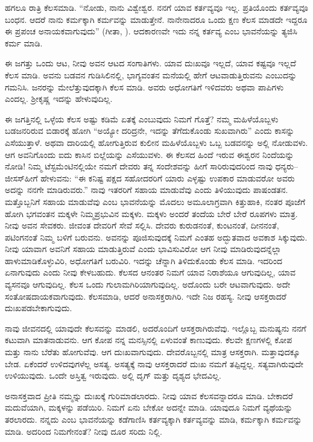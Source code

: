 ಹಗಲೂ ರಾತ್ರಿ ಕೆಲಸಮಾಡಿ. “ನೋಡು, ನಾನು ವಿಶ್ವೇಶ್ವರ. ನನಗೆ ಯಾವ ಕರ್ತವ್ಯವೂ ಇಲ್ಲ. ಪ್ರತಿಯೊಂದು ಕರ್ತವ್ಯವೂ ಬಂಧನ. ಆದರೆ ನಾನು ಕರ್ಮಕ್ಕಾಗಿ ಕರ್ಮವನ್ನು ಮಾಡುತ್ತೇನೆ. ನಾನೇನಾದರೂ ಒಂದು ಕ್ಷಣ ಕೆಲಸ ಮಾಡದೇ ಇದ್ದರೂ ಈ ಪ್ರಪಂಚ ಅನಾಯಕ\-ವಾಗುವುದು” (ಗೀತಾ, ). ಆದಕಾರಣವೇ ಇದು ನನ್ನ ಕರ್ತವ್ಯ ಎಂಬ ಭಾವನೆಯನ್ನು ತ್ಯಜಿಸಿ ಕರ್ಮ ಮಾಡಿ.

ಈ ಜಗತ್ತು ಒಂದು ಆಟ, ನೀವು ಅವನ ಆಟದ ಸಂಗಾತಿಗಳು. ಯಾವ ದುಃಖವೂ ಇಲ್ಲದೆ, ಯಾವ ಕಷ್ಟವೂ ಇಲ್ಲದೆ ಕೆಲಸ ಮಾಡಿ. ಅವನು ಬಡವನ ಗುಡಿಸಿಲಿನಲ್ಲಿ, ಭಾಗ್ಯವಂತನ ಮನೆಯಲ್ಲಿ ಹೇಗೆ ಆಟವಾಡುತ್ತಿರುವನು ಎಂಬುದನ್ನು ಗಮನಿಸಿ. ಜನರನ್ನು ಮೇಲೆತ್ತುವುದಕ್ಕಾಗಿ ಕೆಲಸ ಮಾಡಿ. ಅವರು ಅಧೋಗತಿಗೆ ಇಳಿದವರು ಅಥವಾ ಪಾಪಿಗಳು ಎಂದಲ್ಲ. ಶ‍್ರೀಕೃಷ್ಣ ಇದನ್ನು ಹೇಳುವುದಿಲ್ಲ.

ಈ ಜಗತ್ತಿನಲ್ಲಿ ಒಳ್ಳೆಯ ಕೆಲಸ ಅಷ್ಟು ಕಡಿಮೆ ಏತಕ್ಕೆ ಎಂಬುವುದು ನಿಮಗೆ ಗೊತ್ತೆ? ನಮ್ಮ ಮಹಿಳೆಯೊಬ್ಬಳು ಬಡಜನರಿರುವ ಬಿಡಾರಕ್ಕೆ ಹೋಗಿ “ಅಯ್ಯೋ ದರಿದ್ರನೇ, ಇದನ್ನು ತೆಗೆದುಕೊಂಡು ಸುಖವಾಗಿರು” ಎಂದು ಕಾಸನ್ನು ಎಸೆಯುತ್ತಾಳೆ. ಅಥವಾ ದಾರಿಯಲ್ಲಿ ಹೋಗುತ್ತಿರುವ ಕುಲೀನ ಮಹಿಳೆಯೊಬ್ಬಳು ಒಬ್ಬ ಬಡವನನ್ನು ಅಲ್ಲಿ ನೋಡುವಳು. ಆಗ ಅವನಿಗೊಂದು ಐದು ಕಾಸಿನ ಬಿಲ್ಲೆಯನ್ನು ಎಸೆಯುವಳು. ಈ ಕೆಲಸದ ಹಿಂದೆ ಇರುವ ಈಶ್ವರನ ನಿಂದೆಯನ್ನು ನೋಡಿ! ನಿಮ್ಮ ಟೆಸ್ಟಮೆಂಟಿನಲ್ಲಿಯೇ ನಮಗೆ ದೇವರು ತನ್ನ ಸಂದೇಶವನ್ನು ಹೀಗೆ ಸಾರಿರುವುದರಿಂದ ನಾವು ಧನ್ಯರು– ಜೀಸಸ್​ ಹೀಗೆ ಹೇಳುವನು: “ಈ ಕನಿಷ್ಟ ಪಕ್ಷದ ಸಹೋದರರಿಗೆ ಯಾರು ಎಳ್ಳಷ್ಟು ಉಪಕಾರ ಮಾಡುವರೋ ಅವರು ಅದನ್ನು ನನಗೇ ಮಾಡಿರುವರು.” ನಾವು ಇತರರಿಗೆ ಸಹಾಯ ಮಾಡುವೆವು ಎಂದು ತಿಳಿಯುವುದು ಪಾಷಂಡತನ. ಮತ್ತೊಬ್ಬನಿಗೆ ಸಹಾಯ ಮಾಡುವೆವು ಎಂಬ ಭಾವನೆಯನ್ನು ಮೊದಲು ಅಮೂಲಾಗ್ರವಾಗಿ ಕಿತ್ತುಹಾಕಿ, ನಂತರ ಪೂಜೆಗೆ ಹೋಗಿ ಭಗವಂತನ ಮಕ್ಕಳೇ ನಿಮ್ಮ\break ಪ್ರಭುವಿನ ಮಕ್ಕಳು. ಮಕ್ಕಳು ಅಂದರೆ ತಂದೆಯ ಬೇರೆ ಬೇರೆ ರೂಪಗಳು ಮಾತ್ರ. ನೀವು ಅವನ ಸೇವಕರು. ಜೀವಂತ ದೇವರಿಗೆ ಸೇವೆ ಸಲ್ಲಿಸಿ. ದೇವರು ಕುರುಡನಂತೆ, ಕುಂಟನಂತೆ, ದೀನನಂತೆ, ಪಟಿಂಗನಂತೆ ನಿಮ್ಮ ಬಳಿಗೆ ಬರುವನು. ಅವನನ್ನು ಪೂಜಿಸುವುದಕ್ಕೆ ನಿಮಗೆ ಎಂತಹ ಅದ್ಭುತವಾದ ಅವಕಾಶ ಸಿಕ್ಕುವುದು. ನೀವು ಯಾವಾಗ ಅವನಿಗೆ ಸಹಾಯ ಮಾಡುತ್ತಿರುವೆ ಎಂದು ಭಾವಿಸುವಿರೋ ಆಗ ನೀವು ಮಾಡಿರುವುದನ್ನೆಲ್ಲಾ ಹಾಳುಮಾಡಿಕೊಳ್ಳುವಿರಿ, ಅಧೋಗತಿಗೆ ಬರುವಿರಿ. ಇದನ್ನು ಚೆನ್ನಾಗಿ ತಿಳಿದುಕೊಂಡು ಕೆಲಸ ಮಾಡಿ. ಇದರಿಂದ ಏನಾಗುವುದು ಎಂದು ನೀವು ಕೇಳಬಹುದು. ಕೆಲಸದ ಆನಂತರ ನಿಮಗೆ ಯಾವ ನಿರಾಶೆಯೂ ಆಗುವುದಿಲ್ಲ, ಯಾವ ವ್ಯಸನವೂ ಆಗುವುದಿಲ್ಲ. ಕೆಲಸ ಒಂದು ಗುಲಾಮಗಿರಿಯಾಗುವುದಿಲ್ಲ. ಅದೊಂದು ಬರೇ ಆಟವಾಗುವುದು. ಅದೇ ಸಂತೋಷದಾಯಕವಾಗುವುದು. ಕೆಲಸಮಾಡಿ, ಆದರೆ ಅನಾಸಕ್ತರಾಗಿರಿ. ಇದೇ ನಿಜ ರಹಸ್ಯ. ನೀವು ಆಸಕ್ತರಾದರೆ ದುಃಖಪಡಬೇಕಾಗುವುದು.

ನಾವು ಜೀವನದಲ್ಲಿ ಯಾವುದೇ ಕೆಲಸವನ್ನು ಮಾಡಲಿ, ಅದರೊಂದಿಗೆ ಆಸಕ್ತರಾಗಿರು\-ವೆವು. ಇಲ್ಲೊಬ್ಬ ಮನುಷ್ಯನು ನನಗೆ ಕಟುವಾಗಿ ಮಾತನಾಡುವನು. ಆಗ ಕೋಪ ನನ್ನ ಮನಸ್ಸಿನಲ್ಲಿ ಏಳುವಂತೆ ಕಾಣುವುದು. ಕೆಲವೇ ಕ್ಷಣಗಳಲ್ಲಿ ಕೋಪ ಮತ್ತು ನಾನು ಬೆರೆತು ಹೋಗುವೆವು. ಆಗ ದುಃಖವಾಗುವುದು. ದೇವರೊಬ್ಬನಲ್ಲಿ ಮಾತ್ರ ಆಸಕ್ತರಾಗಿ. ಮತ್ತಾವು\-ದಕ್ಕೂ ಬೇಡ. ಏಕೆಂದರೆ ಉಳಿದವುಗಳೆಲ್ಲ ಅಸತ್ಯ. ಅಸತ್ಯಕ್ಕೆ ನಾವು ಆಸಕ್ತರಾದರೆ ದುಃಖ ನಮಗೆ ತಪ್ಪಿದ್ದಲ್ಲ. ಸತ್ಯವಾಗಿರುವುದೇ ಉಳಿಯುವುದು. ಒಂದೇ ಅಸ್ತಿತ್ವ ಇರುವುದು. ಅಲ್ಲಿ ದೃಗ್​ ಮತ್ತು ದೃಶ್ಯದ ಭೇದವಿಲ್ಲ.

ಅನಾಸಕ್ತವಾದ ಪ್ರೀತಿ ನಮ್ಮನ್ನು ದುಃಖಕ್ಕೆ ಗುರಿಮಾಡಲಾರದು. ನೀವು ಯಾವ ಕೆಲಸವನ್ನಾದರೂ ಮಾಡಿ. ಬೇಕಾದರೆ ಮದುವೆಯಾಗಿ, ಮಕ್ಕಳನ್ನು ಪಡೆಯಿರಿ. ನಿಮಗೆ ಏನು ಬೇಕೋ ಅದನ್ನೇ ಮಾಡಿ. ಯಾವುದೂ ನಿಮಗೆ ವ್ಯಥೆಯನ್ನು ತರಲಾರದು. ನನ್ನದು ಎಂಬ ಭಾವನೆಯನ್ನು ಕಡೆಗಾಣಿಸಿ ಕರ್ತವ್ಯಕ್ಕಾಗಿ ಕರ್ತವ್ಯವನ್ನು ಮಾಡಿ, ಕರ್ಮಕ್ಕಾಗಿ ಕರ್ಮವನ್ನು ಮಾಡಿ. ಅದರಿಂದ ನಿಮಗೇನಂತೆ? ನೀವು ದೂರ ಸರಿದು ನಿಲ್ಲಿ.

